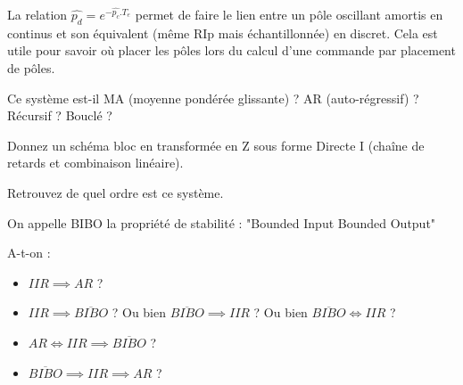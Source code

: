 \begin{remarque}
La relation $\widehat{p_d} = e^{-\widehat{p_c}.T_e}$ permet de faire le lien entre un
pôle oscillant amortis en continus et son équivalent (même RIp mais
échantillonnée) en discret. Cela est utile pour savoir où placer les
pôles lors du calcul d'une commande par placement de pôles.
\end{remarque}
Ce système est-il MA (moyenne pondérée glissante) ? AR (auto-régressif) ? Récursif ? Bouclé ?


Donnez un schéma bloc en transformée en Z sous forme Directe I (chaîne de retards et combinaison linéaire). 

Retrouvez de quel ordre est ce système.

On appelle BIBO la propriété de stabilité : "Bounded Input Bounded Output"

A-t-on :  
\begin{itemize}
\item $IIR \implies AR$ ?
\item $IIR \implies \overline{BIBO}$ ? Ou bien $ \overline{BIBO} \implies IIR$ ? Ou bien $\overline{BIBO} \iff IIR$ ?
\item $AR \iff IIR \implies \overline{BIBO}$ ?
\item $\overline{BIBO} \implies IIR \implies AR$ ?
\end{itemize}
